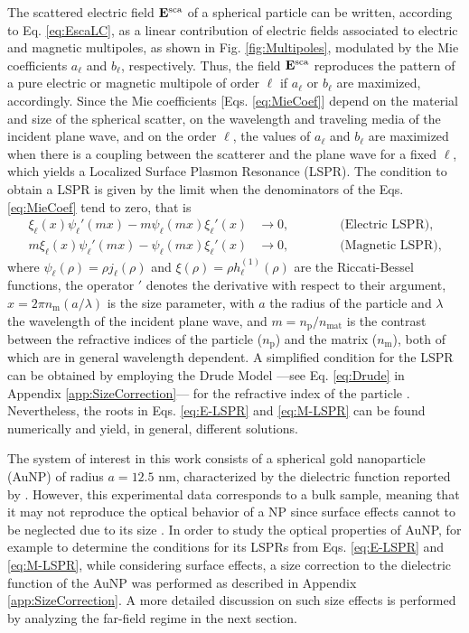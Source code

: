 The scattered electric field $\vb{E}^\text{sca}$ of a spherical particle can be written, according to Eq. \eqref{eq:EscaLC}, as a linear contribution of electric fields associated to electric and magnetic multipoles, as shown in Fig. \ref{fig:Multipoles}, modulated by the Mie coefficients $a_\ell$ and $b_\ell$, respectively. Thus, the field $\vb{E}^\text{sca}$ reproduces the pattern of a pure  electric or magnetic multipole of order $\ell$ if $a_\ell$ or $b_\ell$ are maximized, accordingly. Since the Mie coefficients [Eqs. \eqref{eq:MieCoef}]  depend on the material and size of the spherical scatter, on the wavelength and traveling media of the incident plane wave, and on  the order $\ell$, the values of $a_\ell$ and $b_\ell$ are maximized when there is a coupling between the scatterer and the plane wave for a fixed $\ell$, which yields a Localized Surface Plasmon Resonance (LSPR). The condition to obtain a LSPR is given by the limit when the denominators of the Eqs. \eqref{eq:MieCoef} tend to zero, that is
%
\begin{align}
 	\xi_\ell(x)\psi_\ell'(mx)-m\psi_\ell(mx)\xi_\ell'(x) &\to 0, \qquad\qquad \text{(Electric LSPR),}
 		\label{eq:E-LSPR}\\
 	m\xi_\ell(x)\psi_\ell'(mx)-\psi_\ell(mx)\xi_\ell'(x) &\to 0, \qquad\qquad \text{(Magnetic LSPR),}
 		\label{eq:M-LSPR}
\end{align}
%
where $\psi_\ell( \rho) = \rho j_\ell(\rho)$ and $\xi(\rho) = \rho h_\ell^{(1)}(\rho)$  are the Riccati-Bessel functions, the operator $'$ denotes the derivative with respect to their argument,  $x= 2\pi n_\text{m} (a/\lambda)$ is the size parameter, with $a$ the radius of the particle and $\lambda$ the wavelength of the incident plane wave, and $m =  n_\text{p} / n_\text{mat}$ is the contrast between the refractive indices of the particle ($n_\text{p}$) and the matrix ($n_\text{m}$), both of which are in general wavelength dependent. A simplified condition for the  LSPR can be obtained by employing the Drude Model ---see Eq. \eqref{eq:Drude} in Appendix \ref{app:SizeCorrection}--- for the refractive index of the particle \cite{maciel_escudero_linear_2017}. Nevertheless, the roots in Eqs. \eqref{eq:E-LSPR} and \eqref{eq:M-LSPR} can be found numerically and yield, in general, different solutions.

The system of interest in this work consists of a spherical gold nanoparticle (AuNP) of  radius $a = 12.5$ nm, characterized by the dielectric function reported by \citeauthor{johnson_optical_1972} \cite{johnson_optical_1972}.  However, this experimental data corresponds to a bulk sample, meaning that it may not reproduce the optical behavior of a NP since surface effects cannot to be neglected  due to its size \cite{noguez_surface_2007}. In order to study  the optical properties of AuNP, for example to determine the conditions for its LSPRs from   Eqs. \eqref{eq:E-LSPR}  and \eqref{eq:M-LSPR}, while considering  surface effects,  a size correction to the dielectric function of the AuNP was performed as described in Appendix \ref{app:SizeCorrection}. A more detailed discussion on such size effects is performed by analyzing the far-field regime in the next section.

